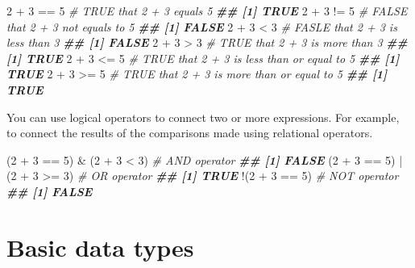 \documentclass[
]{book}
\newenvironment{Shaded}{\begin{snugshade}}{\end{snugshade}}
\newcommand{\CommentTok}[1]{\textcolor[rgb]{0.56,0.35,0.01}{\textit{#1}}}
\newcommand{\DecValTok}[1]{\textcolor[rgb]{0.00,0.00,0.81}{#1}}
\newcommand{\DocumentationTok}[1]{\textcolor[rgb]{0.56,0.35,0.01}{\textbf{\textit{#1}}}}
\newcommand{\NormalTok}[1]{#1}
\newcommand{\SpecialCharTok}[1]{\textcolor[rgb]{0.00,0.00,0.00}{#1}}
\begin{document}
\begin{Shaded}
\begin{Highlighting}[]
\DecValTok{2} \SpecialCharTok{+} \DecValTok{3} \SpecialCharTok{==} \DecValTok{5} \CommentTok{\# TRUE that 2 + 3 equals 5}
\DocumentationTok{\#\# [1] TRUE}
\DecValTok{2} \SpecialCharTok{+} \DecValTok{3} \SpecialCharTok{!=} \DecValTok{5} \CommentTok{\# FALSE that 2 + 3 not equals to 5}
\DocumentationTok{\#\# [1] FALSE}
\DecValTok{2} \SpecialCharTok{+} \DecValTok{3} \SpecialCharTok{\textless{}} \DecValTok{3} \CommentTok{\# FASLE that 2 + 3 is less than 3}
\DocumentationTok{\#\# [1] FALSE}
\DecValTok{2} \SpecialCharTok{+} \DecValTok{3} \SpecialCharTok{\textgreater{}} \DecValTok{3} \CommentTok{\# TRUE that 2 + 3 is more than 3}
\DocumentationTok{\#\# [1] TRUE}
\DecValTok{2} \SpecialCharTok{+} \DecValTok{3} \SpecialCharTok{\textless{}=} \DecValTok{5} \CommentTok{\# TRUE that 2 + 3 is less than or equal to 5}
\DocumentationTok{\#\# [1] TRUE}
\DecValTok{2} \SpecialCharTok{+} \DecValTok{3} \SpecialCharTok{\textgreater{}=} \DecValTok{5} \CommentTok{\# TRUE that 2 + 3 is more than or equal to 5}
\DocumentationTok{\#\# [1] TRUE}
\end{Highlighting}
\end{Shaded}

You can use logical operators to connect two or more expressions. For example, to connect the results of the comparisons made using relational operators.

\begin{Shaded}
\begin{Highlighting}[]
\NormalTok{(}\DecValTok{2} \SpecialCharTok{+} \DecValTok{3} \SpecialCharTok{==} \DecValTok{5}\NormalTok{) }\SpecialCharTok{\&}\NormalTok{ (}\DecValTok{2} \SpecialCharTok{+} \DecValTok{3} \SpecialCharTok{\textless{}} \DecValTok{3}\NormalTok{) }\CommentTok{\# AND operator}
\DocumentationTok{\#\# [1] FALSE}
\NormalTok{(}\DecValTok{2} \SpecialCharTok{+} \DecValTok{3} \SpecialCharTok{==} \DecValTok{5}\NormalTok{) }\SpecialCharTok{|}\NormalTok{ (}\DecValTok{2} \SpecialCharTok{+} \DecValTok{3} \SpecialCharTok{\textgreater{}=} \DecValTok{3}\NormalTok{) }\CommentTok{\# OR operator}
\DocumentationTok{\#\# [1] TRUE}
\SpecialCharTok{!}\NormalTok{(}\DecValTok{2} \SpecialCharTok{+} \DecValTok{3} \SpecialCharTok{==} \DecValTok{5}\NormalTok{) }\CommentTok{\# NOT operator}
\DocumentationTok{\#\# [1] FALSE}
\end{Highlighting}
\end{Shaded}

\hypertarget{basic-data-types}{%
\section{Basic data types}\label{basic-data-types}}
\end{document}
